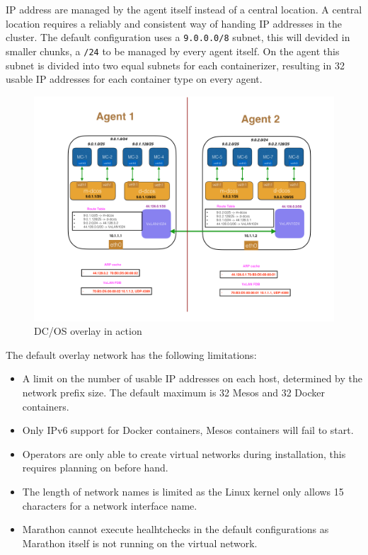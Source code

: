 IP address are managed by the agent itself instead of a central location. A central location requires a reliably and consistent way of handing IP addresses in the cluster. The default configuration uses a \texttt{9.0.0.0/8} subnet, this will devided in smaller chunks, a \texttt{/24} to be managed by every agent itself. On the agent this subnet is divided into two equal subnets for each containerizer, resulting in 32 usable IP addresses for each container type on every agent.
\begin{figure}
    \centering
    \includegraphics[width=1\columnwidth]{images/dcos-overlay-arch}
    \caption{DC/OS overlay in action\cite{dcos_overlay_arch}}
    \label{fig:dcos-overlay-arch}
\end{figure}

The default overlay network has the following limitations:
\begin{itemize}
    \item A limit on the number of usable IP addresses on each host, determined by the network prefix size. The default maximum is 32 Mesos and 32 Docker containers.
    \item Only IPv6 support for Docker containers, Mesos containers will fail to start.
    \item Operators are only able to create virtual networks during installation, this requires planning on before hand.
    \item The length of network names is limited as the Linux kernel only allows 15 characters for a network interface name.
    \item Marathon cannot execute healhtchecks in the default configurations as Marathon itself is not running on the virtual network.
\end{itemize}

